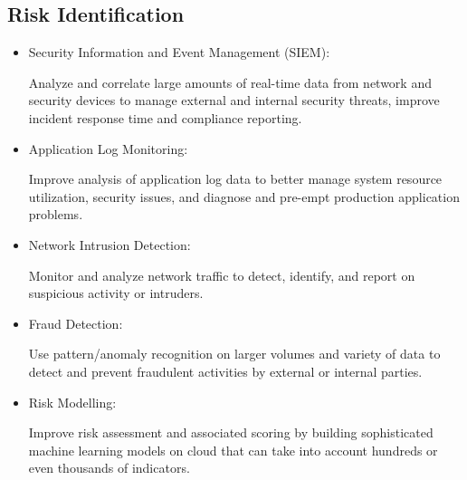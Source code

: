 \documentclass[oneside,a4paper,12pt]{book}
\begin{document}
\subsection{Risk Identification}
\begin{itemize}
    \item Security Information and Event Management (SIEM): 
    \par Analyze and correlate large amounts of real-time data from network and security devices to manage external and internal security threats, improve incident response time and compliance reporting.
    \item Application Log Monitoring:
    \par Improve analysis of application log data to better manage system resource utilization, security issues, and diagnose and pre-empt production application problems.
    \item Network Intrusion Detection:
    \par Monitor and analyze network traffic to detect, identify, and report on suspicious activity or intruders.
    \item Fraud Detection:
    \par Use pattern/anomaly recognition on larger volumes and variety of data to detect and prevent fraudulent activities by external or internal parties.
    \item Risk Modelling:
    \par Improve risk assessment and associated scoring by building sophisticated machine learning models on cloud that can take into account hundreds or even thousands of indicators.
\end{itemize}
\end{document}
